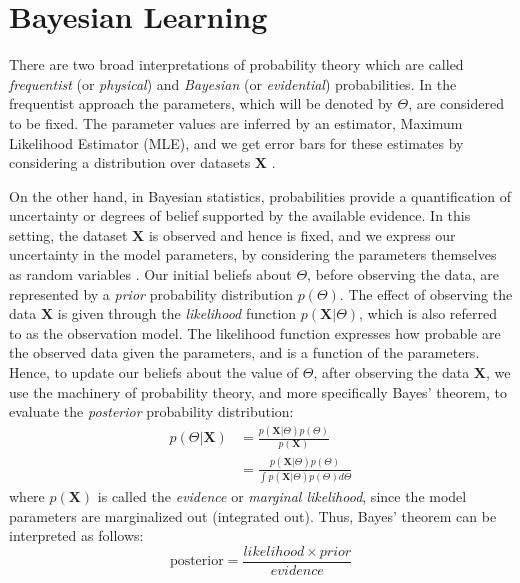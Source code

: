 \section{Bayesian Learning} \label{bayesian-learning-section}
There are two broad interpretations of probability theory which are called \emph{frequentist} (or \emph{physical}) and \emph{Bayesian} (or \emph{evidential}) probabilities. In the frequentist approach the parameters, which will be denoted by $\Theta$, are considered to be fixed. The parameter values are inferred by an estimator, \eg Maximum Likelihood Estimator (MLE), and we get error bars for these estimates by considering a distribution over datasets $\mathbf{X}$ \cite[Ch. 1]{Bishop2006}. 

On the other hand, in Bayesian statistics, probabilities provide a quantification of uncertainty or degrees of belief supported by the available evidence. In this setting, the dataset $\mathbf{X}$ is observed and hence is fixed, and we express our uncertainty in the model parameters, by considering the parameters themselves as random variables \cite[Ch. 1]{Bishop2006}. Our initial beliefs about $\Theta$, before observing the data, are represented by a \emph{prior} probability distribution $p(\Theta)$. The effect of observing the data $\mathbf{X}$ is given through the \emph{likelihood} function $p(\mathbf{X}|\Theta)$, which is also referred to as the observation model. The likelihood function expresses how probable are the observed data given the parameters, and is a function of the parameters. Hence, to update our beliefs about the value of $\Theta$, after observing the data $\mathbf{X}$, we use the machinery of probability theory, and more specifically Bayes' theorem, to evaluate the \emph{posterior} probability distribution:
\begin{equation}
  \begin{aligned}
	p(\Theta | \mathbf{X}) & = \frac{p(\mathbf{X}|\Theta) p(\Theta)}{p(\mathbf{X})} \\
	& = \frac{p(\mathbf{X}|\Theta) p(\Theta)}{\int p(\mathbf{X}|\Theta) p(\Theta) d\Theta}
  \end{aligned}
\end{equation}
where $p(\mathbf{X})$ is called the \emph{evidence} or \emph{marginal likelihood}, since the model parameters are marginalized out (\ie integrated out). Thus, Bayes' theorem can be interpreted as follows:
\begin{equation}
	\text{posterior} = \frac{likelihood \times prior}{evidence}
\end{equation}

